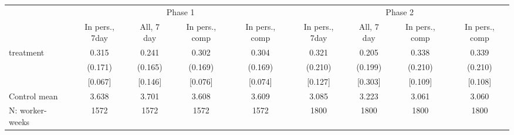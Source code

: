 \begin{tabular}{l*{8}{c}}
\toprule
            &\multicolumn{4}{c}{Phase 1}                        &\multicolumn{4}{c}{Phase 2}                        \\\cmidrule(lr){2-5}\cmidrule(lr){6-9}
            &\multicolumn{1}{c}{In pers., 7day}&\multicolumn{1}{c}{All, 7 day}&\multicolumn{1}{c}{In pers., comp}&\multicolumn{1}{c}{In pers., comp}&\multicolumn{1}{c}{In pers., 7day}&\multicolumn{1}{c}{All, 7 day}&\multicolumn{1}{c}{In pers., comp}&\multicolumn{1}{c}{In pers., comp}\\
\midrule
treatment   &       0.315&       0.241&       0.302&       0.304&       0.321&       0.205&       0.338&       0.339\\
            &     (0.171)&     (0.165)&     (0.169)&     (0.169)&     (0.210)&     (0.199)&     (0.210)&     (0.210)\\
            &     [0.067]&     [0.146]&     [0.076]&     [0.074]&     [0.127]&     [0.303]&     [0.109]&     [0.108]\\
\midrule
Control mean&       3.638&       3.701&       3.608&       3.609&       3.085&       3.223&       3.061&       3.060\\
N: worker-weeks&        1572&        1572&        1572&        1572&        1800&        1800&        1800&        1800\\
\bottomrule
\end{tabular}
